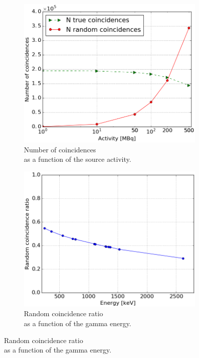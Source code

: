 \begin{figure}
\begin{subfigure}[t]{.5\textwidth}
\centering
  \includegraphics[width=.95\linewidth]{03_GraphicFiles/chapter5_SPECTsimu/SPECT/compton/timing/CoincidenceCounts}
  \caption{Number of coincidences \\ as a function of the source activity.}
  \label{chap5::fig::timing_counts}
\end{subfigure}
\begin{subfigure}[t]{.5\textwidth}
\centering
  \includegraphics[width=.95\linewidth]{03_GraphicFiles/chapter5_SPECTsimu/SPECT/compton/timing/randomRatioVSenergy}
  \caption{Random coincidence ratio \\ as a function of the gamma energy.}

\end{subfigure}
\end{figure}

